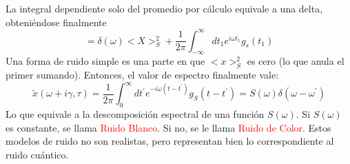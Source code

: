 \documentclass{book}
\begin{document}
La integral dependiente solo del promedio por cálculo equivale a una delta, obteniéndose finalmente
\begin{equation}\label{eq6.24}=\delta(\omega)<X>_S^2+\frac{1}{2\pi}\int_{-\infty}^{\infty} dt_1 e^{i\omega t_1}g_s(t_1)\end{equation}
Una forma de ruido simple es una parte en que $<x>_S^2$ es cero (lo que anula el primer sumando). Entonces, el valor de espectro finalmente vale:
\begin{equation}\label{eq6.25}\tilde{x}(\omega+i\gamma,\tau)=\frac{1}{2\pi}\int_0^\infty dt^\prime e^{-i\omega(t-t^\prime)}g_S(t-t^\prime)=S(\omega)\delta(\omega-\omega^\prime)\end{equation}
Lo que equivale a la descomposición espectral de una función $S(\omega)$. Si $S(\omega)$ es constante, se llama \textcolor{red}{Ruido Blanco}. Si no, se le llama \textcolor{red}{Ruido de Color}. Estos modelos de ruido no son realistas, pero representan bien lo correspondiente al ruido cuántico.
\end{document}
